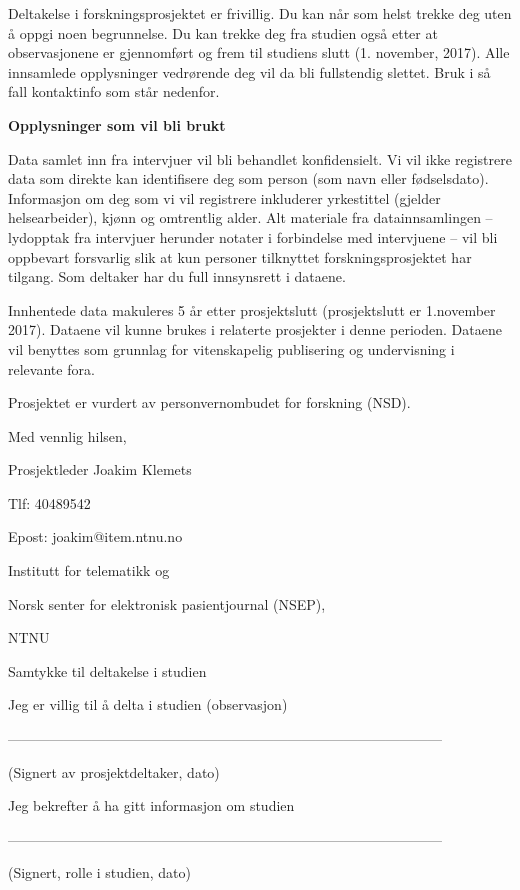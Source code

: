 \noindent
Deltakelse i forskningsprosjektet er frivillig. Du kan når som helst trekke deg uten å oppgi noen begrunnelse. Du kan trekke deg fra studien også etter at observasjonene er gjennomført og frem til studiens slutt (1. november, 2017). Alle innsamlede opplysninger vedrørende deg vil da bli fullstendig slettet. Bruk i så fall kontaktinfo som står nedenfor.

\noindent
\textbf{Opplysninger som vil bli brukt}

\noindent
Data samlet inn fra intervjuer vil bli behandlet konfidensielt. Vi vil ikke registrere data som direkte kan identifisere deg som person (som navn eller fødselsdato). Informasjon om deg som vi vil registrere inkluderer yrkestittel (gjelder helsearbeider), kjønn og omtrentlig alder. Alt materiale fra datainnsamlingen -- lydopptak fra intervjuer herunder notater i forbindelse med intervjuene -- vil bli oppbevart forsvarlig slik at kun personer tilknyttet forskningsprosjektet har tilgang. Som deltaker har du full innsynsrett i dataene. 

\noindent
Innhentede data makuleres 5 år etter prosjektslutt (prosjektslutt er 1.november 2017). Dataene vil kunne brukes i relaterte prosjekter i denne perioden. Dataene vil benyttes som grunnlag for vitenskapelig publisering og undervisning i relevante fora.

\noindent
Prosjektet er vurdert av personvernombudet for forskning (NSD).

\noindent
Med vennlig hilsen,                                                                                               

\noindent
Prosjektleder Joakim Klemets

\noindent
Tlf: 40489542

\noindent
Epost: joakim@item.ntnu.no

\noindent
Institutt for telematikk og

\noindent
Norsk senter for elektronisk pasientjournal (NSEP),

\noindent
NTNU

\noindent
Samtykke til deltakelse i studien

\noindent
Jeg er villig til å delta i studien (observasjon)

\noindent
---------------------------------------------------------------------------------------------

\noindent
(Signert av prosjektdeltaker, dato)


\noindent
Jeg bekrefter å ha gitt informasjon om studien


\noindent
---------------------------------------------------------------------------------------------

\noindent
(Signert, rolle i studien, dato)


